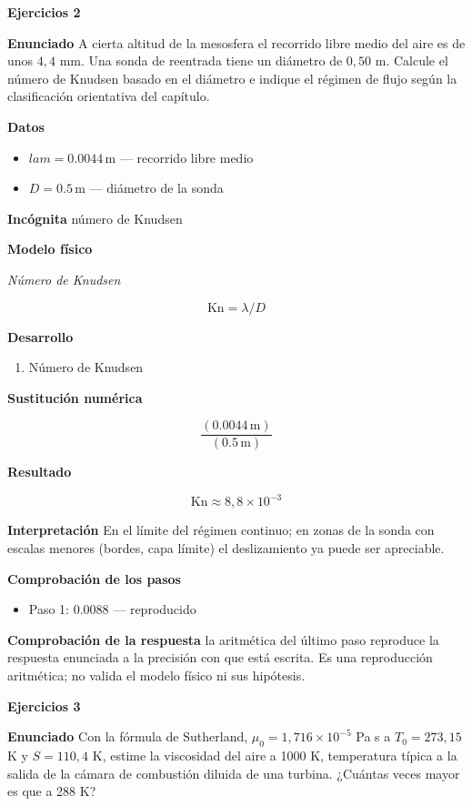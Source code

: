 \documentclass[10pt,openany]{book}
\begin{document}
\noindent\textbf{Ejercicios 2}

\noindent\textbf{Enunciado}
A cierta altitud de la mesosfera el recorrido libre medio del aire es de unos \(4{,}4\) mm. Una sonda de reentrada tiene un diámetro de \(0{,}50\) m. Calcule el número de Knudsen basado en el diámetro e indique el régimen de flujo según la clasificación orientativa del capítulo.

\noindent\textbf{Datos}
\begin{itemize}
\item $lam = 0.0044\,\mathrm{m}$ — recorrido libre medio
\item $D = 0.5\,\mathrm{m}$ — diámetro de la sonda
\end{itemize}

\noindent\textbf{Incógnita}
número de Knudsen

\noindent\textbf{Modelo físico}

\noindent\textit{Número de Knudsen}

\[
\mathrm{Kn} = \lambda/D
\]

\noindent\textbf{Desarrollo}
\begin{enumerate}
\item
Número de Knudsen
\end{enumerate}

\noindent\textbf{Sustitución numérica}

\[
\frac{\left(0.0044\,\mathrm{m}\right)}{\left(0.5\,\mathrm{m}\right)}
\]

\noindent\textbf{Resultado}

\[
\mathrm{Kn} \approx 8{,}8\times 10^{-3}
\]

\noindent\textbf{Interpretación}
En el límite del régimen continuo; en zonas de la sonda con escalas menores (bordes, capa límite) el deslizamiento ya puede ser apreciable.

\noindent\textbf{Comprobación de los pasos}
\begin{itemize}
\item Paso 1: $0.0088$ — reproducido
\end{itemize}

\noindent\textbf{Comprobación de la respuesta} la aritmética del último paso reproduce la respuesta enunciada a la precisión con que está escrita. Es una reproducción aritmética; no valida el modelo físico ni sus hipótesis.

\noindent\textbf{Ejercicios 3}

\noindent\textbf{Enunciado}
Con la fórmula de Sutherland, \(\mu_0 = 1{,}716\times 10^{-5}\) Pa s a \(T_0 = 273{,}15\) K y \(S = 110{,}4\) K, estime la viscosidad del aire a 1000 K, temperatura típica a la salida de la cámara de combustión diluida de una turbina. ¿Cuántas veces mayor es que a 288 K?
\end{document}
